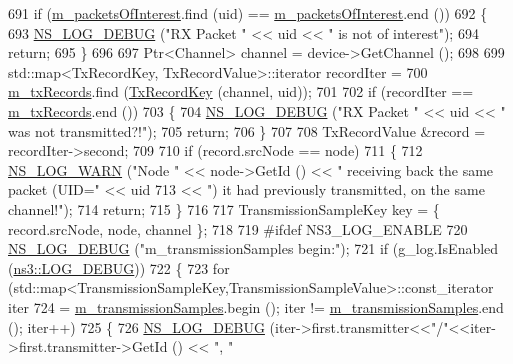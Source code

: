 \begin{DoxyCode}
691   \textcolor{keywordflow}{if} (\hyperlink{classns3_1_1PyViz_af922cc7db7145889b2e518e568eac467}{m\_packetsOfInterest}.find (uid) == \hyperlink{classns3_1_1PyViz_af922cc7db7145889b2e518e568eac467}{m\_packetsOfInterest}.end ())
692     \{
693       \hyperlink{group__logging_ga413f1886406d49f59a6a0a89b77b4d0a}{NS\_LOG\_DEBUG} (\textcolor{stringliteral}{"RX Packet "} << uid << \textcolor{stringliteral}{" is not of interest"});
694       \textcolor{keywordflow}{return};
695     \}
696 
697   Ptr<Channel> channel = device->GetChannel ();
698 
699   std::map<TxRecordKey, TxRecordValue>::iterator recordIter = 
700     \hyperlink{classns3_1_1PyViz_ad051157796c1dee630ca8705ed89bbb6}{m\_txRecords}.find (\hyperlink{classns3_1_1PyViz_afe99c7883d8999b0d669eceda3254caf}{TxRecordKey} (channel, uid));
701 
702   \textcolor{keywordflow}{if} (recordIter == \hyperlink{classns3_1_1PyViz_ad051157796c1dee630ca8705ed89bbb6}{m\_txRecords}.end ())
703     \{
704       \hyperlink{group__logging_ga413f1886406d49f59a6a0a89b77b4d0a}{NS\_LOG\_DEBUG} (\textcolor{stringliteral}{"RX Packet "} << uid << \textcolor{stringliteral}{" was not transmitted?!"});
705       \textcolor{keywordflow}{return};
706     \}
707 
708   TxRecordValue &record = recordIter->second;
709 
710   \textcolor{keywordflow}{if} (record.srcNode == node)
711     \{
712       \hyperlink{group__logging_gade7208b4009cdf0e25783cd26766f559}{NS\_LOG\_WARN} (\textcolor{stringliteral}{"Node "} << node->GetId () << \textcolor{stringliteral}{" receiving back the same packet (UID="} << uid
713                            << \textcolor{stringliteral}{") it had previously transmitted, on the same channel!"});
714       \textcolor{keywordflow}{return};
715     \}
716 
717   TransmissionSampleKey key = \{ record.srcNode, node, channel \};
718 
719 \textcolor{preprocessor}{#ifdef  NS3\_LOG\_ENABLE}
720   \hyperlink{group__logging_ga413f1886406d49f59a6a0a89b77b4d0a}{NS\_LOG\_DEBUG} (\textcolor{stringliteral}{"m\_transmissionSamples begin:"});
721   \textcolor{keywordflow}{if} (g\_log.IsEnabled (\hyperlink{namespacens3_aa6464a4d69551a9cc968e17a65f39bdbae5a9fe44e2d62303656baa0cf1a687a0}{ns3::LOG\_DEBUG}))
722     \{
723       \textcolor{keywordflow}{for} (std::map<TransmissionSampleKey,TransmissionSampleValue>::const\_iterator iter
724              = \hyperlink{classns3_1_1PyViz_ab5e919d5d58fc6088fc94f5792a34225}{m\_transmissionSamples}.begin (); iter != 
      \hyperlink{classns3_1_1PyViz_ab5e919d5d58fc6088fc94f5792a34225}{m\_transmissionSamples}.end (); iter++)
725         \{
726           \hyperlink{group__logging_ga413f1886406d49f59a6a0a89b77b4d0a}{NS\_LOG\_DEBUG} (iter->first.transmitter<<\textcolor{stringliteral}{"/"}<<iter->first.transmitter->GetId () << \textcolor{stringliteral}{", "}

\end{DoxyCode}

